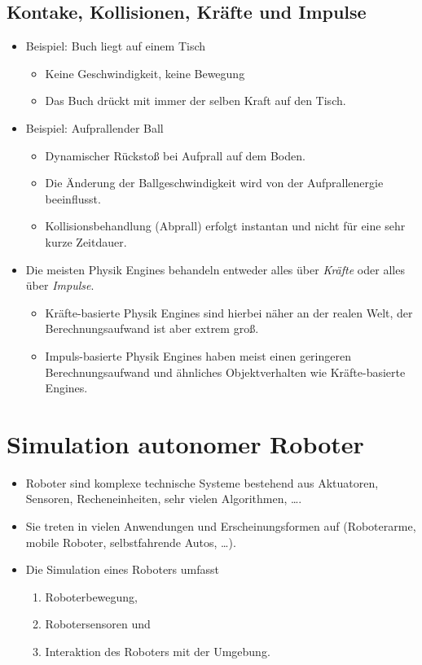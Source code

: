 	\section{Kontake, Kollisionen, Kräfte und Impulse} %
		\begin{itemize}
			\item Beispiel: Buch liegt auf einem Tisch
				\begin{itemize}
					\item Keine Geschwindigkeit, keine Bewegung
					\item Das Buch drückt mit immer der selben Kraft auf den Tisch.
				\end{itemize}
			\item Beispiel: Aufprallender Ball
				\begin{itemize}
					\item Dynamischer Rückstoß bei Aufprall auf dem Boden.
					\item Die Änderung der Ballgeschwindigkeit wird von der Aufprallenergie beeinflusst.
					\item Kollisionsbehandlung (Abprall) erfolgt instantan und nicht für eine sehr kurze Zeitdauer.
				\end{itemize}
			\item Die meisten Physik Engines behandeln entweder alles über \textit{Kräfte} oder alles über \textit{Impulse}.
				\begin{itemize}
					\item Kräfte-basierte Physik Engines sind hierbei näher an der realen Welt, der Berechnungsaufwand ist aber extrem groß.
					\item Impuls-basierte Physik Engines haben meist einen geringeren Berechnungsaufwand und ähnliches Objektverhalten wie Kräfte-basierte Engines.
				\end{itemize}
		\end{itemize}

\chapter{Simulation autonomer Roboter} %
	\begin{itemize}
		\item Roboter sind komplexe technische Systeme bestehend aus Aktuatoren, Sensoren, Recheneinheiten, sehr vielen Algorithmen, \dots.
		\item Sie treten in vielen Anwendungen und Erscheinungsformen auf (Roboterarme, mobile Roboter, selbstfahrende Autos, \dots).
		\item Die Simulation eines Roboters umfasst
			\begin{enumerate}
				\item Roboterbewegung,
				\item Robotersensoren und
				\item Interaktion des Roboters mit der Umgebung.
			\end{enumerate}
	\end{itemize}

